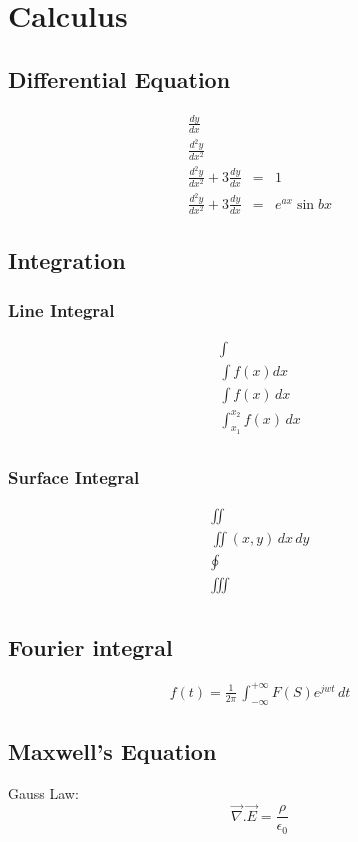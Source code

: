 \documentclass[12pt,a4paper]{report}
\begin{document}
\chapter{Calculus}
\section{Differential Equation}
\begin{eqnarray}
\frac{dy}{dx}\\
\frac{d^{2}y}{dx^{2}}\\
\frac{d^{2}y}{dx^{2}}+3\frac{dy}{dx}&=&1 \\
\frac{d^{2}y}{dx^{2}}+3\frac{dy}{dx}&=&e^{ax}\sin{bx}
\end{eqnarray}
\section{Integration}
\subsection{Line Integral}
\begin{eqnarray*}
\int\\
\int f(x) dx \\
\int f(x) \,dx \\
\int_{x_{1}}^{x_{2}}f(x)\,dx\\
\end{eqnarray*}
\subsection{Surface Integral}
\begin{eqnarray*}
\iint\\
\iint(x,y) \, dx \,dy\\
\oint\\
\iiint\\
\end{eqnarray*}

\section{Fourier integral}
\begin{eqnarray}
f(t)=\frac{1}{2\pi}\,\int_{-\infty}^{+\infty}F(S)e^{jwt}\,dt
\end{eqnarray}

\section{Maxwell's Equation}
Gauss Law:\\
$$\overset{\rightarrow}{\nabla}.\overset{\rightarrow}{E}=\frac{\rho}{\epsilon_{0}}$$
\end{document}
